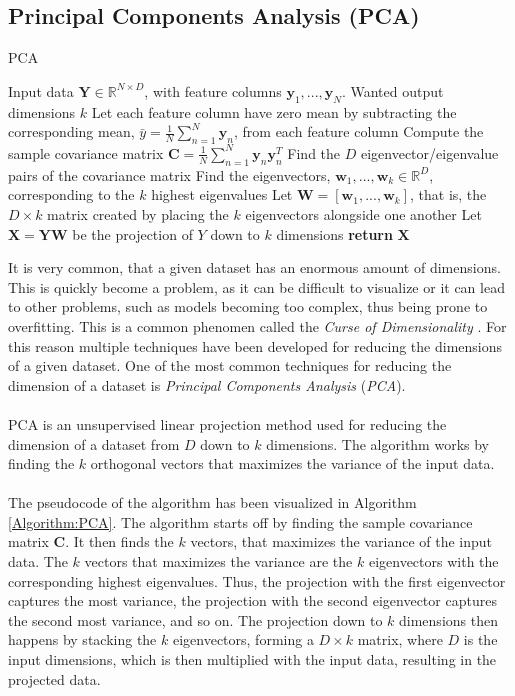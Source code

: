 \documentclass[./main.tex]{subfiles}
\begin{document}
\subsection{Principal Components Analysis (PCA)}
\begin{algorithm}[htbp]
    \caption{PCA \cite{MAD_book}}
    \begin{algorithmic}[1]
        \Require Input data $\bm{Y} \in \mathbb{R}^{N \times D}$, with feature columns $\bm{y}_1, ..., \bm{y}_N$.
        \Require Wanted output dimensions $k$
        \State Let each feature column have zero mean by subtracting the corresponding mean, $\bar{y} = \frac{1}{N} \sum_{n = 1} ^N \bm{y}_n$, from each feature column
        \State Compute the sample covariance matrix $\bm{C} = \frac{1}{N} \sum_{n = 1} ^N \bm{y}_n \bm{y}_n ^T$ 
        \State Find the $D$ eigenvector/eigenvalue pairs of the covariance matrix
        \State Find the eigenvectors, $\bm{w}_1, ..., \bm{w}_k \in \mathbb{R}^D$, corresponding to the $k$ highest eigenvalues
        \State Let $\bm{W} = \left[ \bm{w}_1, ..., \bm{w}_k \right]$, that is, the $D \times k$ matrix created by placing the $k$ eigenvectors alongside one another
        \State Let $\bm{X} = \bm{Y} \bm{W}$ be the projection of $Y$ down to $k$ dimensions
        \State \textbf{return} $\bm{X}$
    \end{algorithmic}
    \label{Algorithm:PCA}
\end{algorithm}

It is very common, that a given dataset has an enormous amount of dimensions. This is quickly become a problem, as it can be difficult to visualize or it can lead to other problems, such as models becoming too complex, thus being prone to overfitting. This is a common phenomen called the \textit{Curse of Dimensionality} \cite{ESL}. For this reason multiple techniques have been developed for reducing the dimensions of a given dataset. One of the most common techniques for reducing the dimension of a dataset is \textit{Principal Components Analysis} (\textit{PCA}).
\\
\\
PCA is an unsupervised linear projection method used for reducing the dimension of a dataset from $D$ down to $k$ dimensions. The algorithm works by finding the $k$ orthogonal vectors that maximizes the variance of the input data. \cite{MAD_book} 
\\
\\
The pseudocode of the algorithm has been visualized in Algorithm \ref{Algorithm:PCA}. The algorithm starts off by finding the sample covariance matrix $\bm{C}$. It then finds the $k$ vectors, that maximizes the variance of the input data. The $k$ vectors that maximizes the variance are the $k$ eigenvectors with the corresponding highest eigenvalues. Thus, the projection with the first eigenvector captures the most variance, the projection with the second eigenvector captures the second most variance, and so on. The projection down to $k$ dimensions then happens by stacking the $k$ eigenvectors, forming a $D \times k$ matrix, where $D$ is the input dimensions, which is then multiplied with the input data, resulting in the projected data. \cite{MAD_book}
\end{document}
